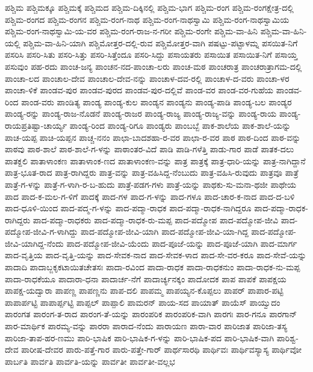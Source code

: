 ಪಶ್ಚಿಮ
ಪಶ್ಚಿಮಕ್ಕೂ
ಪಶ್ಚಿಮಕ್ಕೆ
ಪಶ್ಚಿಮದ
ಪಶ್ಚಿಮ-ದಿಕ್ಕಿನಲ್ಲಿ
ಪಶ್ಚಿಮ-ಭಾಗ
ಪಶ್ಚಿಮ-ರಂಗ
ಪಶ್ಚಿಮ-ರಂಗಕ್ಷೇತ್ರ-ದಲ್ಲಿ
ಪಶ್ಚಿಮ-ರಂಗದ
ಪಶ್ಚಿಮ-ರಂಗನ
ಪಶ್ಚಿಮ-ರಂಗ-ನಾಥ
ಪಶ್ಚಿಮ-ರಂಗ-ನಾಥಸ್ವಾಮಿ
ಪಶ್ಚಿಮ-ರಂಗ-ನಾಥಸ್ವಾಮಿಯ
ಪಶ್ಚಿಮ-ರಂಗ-ನಾಥಸ್ವಾಮಿ-ಯ-ವರ
ಪಶ್ಚಿಮ-ರಂಗ-ರಾಜ-ನ-ಗರೀ
ಪಶ್ಚಿಮ-ರಂಗೇ
ಪಶ್ಚಿಮ-ವಾ-ಹಿನಿ
ಪಶ್ಚಿಮ-ವಾ-ಹಿನಿ-ಯಲ್ಲಿ
ಪಶ್ಚಿಮ-ವಾ-ಹಿನಿ-ಯಾಗಿ
ಪಶ್ಚಿಮೋತ್ತರ-ದಲ್ಲಿ-ರುವ
ಪಶ್ಚಿಮೋತ್ತರ-ವಾಗಿ
ಪಷಟ್ಟು-ಪಟ್ಟಾಳಮ್ನ
ಪಸಯಿತ-ನಿಗೆ
ಪಸರಿಸಿ
ಪಸರಿ-ಸಿತು
ಪಸರಿ-ಸಿತ್ತು
ಪಸರಿ-ಸಿತ್ತೆಂದೂ
ಪಸರಿ-ಸಿದ್ದು
ಪಸಾಯತರು
ಪಸಾಯಿತ
ಪಸಾಯಿತ-ನಿಗೆ
ಪಸಾಯ್ತ
ಪಸುವುಂ
ಪಹ-ರದು
ಪಾಂಚ-ಜನ್ಯ
ಪಾಂಚನ-ನದ-ಪಾಂಚಾ-ಲರು
ಪಾಂಚ-ಮಠ
ಪಾಂಚರಾತ್ರ
ಪಾಂಚರಾತ್ರಾಗಮ-ದಲ್ಲಿ
ಪಾಂಚಾ-ಲದ
ಪಾಂಚಾಲ-ದೇವ
ಪಾಂಚಾಲ-ದೇವ-ನನ್ನು
ಪಾಂಚಾಳ-ದವ-ರಲ್ಲಿ
ಪಾಂಚಾಳ-ದ-ವರು
ಪಾಂಚಾ-ಳರ
ಪಾಂಚಾ-ಳಿಕೆ
ಪಾಂಡವ-ಪುರ
ಪಾಂಡವ-ಪುರದ
ಪಾಂಡವ-ಪುರ-ದಲ್ಲಿವೆ
ಪಾಂಡ-ವರ
ಪಾಂಡ-ವರ-ಗುಹೆಯ
ಪಾಂಡವ-ರಿಂದ
ಪಾಂಡ-ವರು
ಪಾಂಡಿತ್ಯ
ಪಾಂಡ್ಯ
ಪಾಂಡ್ಯ-ಕುಲ
ಪಾಂಡ್ಯನ
ಪಾಂಡ್ಯನು
ಪಾಂಡ್ಯ-ಪಾಡಿ
ಪಾಂಡ್ಯ-ಬಲ
ಪಾಂಡ್ಯರ
ಪಾಂಡ್ಯ-ರನ್ನು
ಪಾಂಡ್ಯ-ರಾಜ-ನೊಡನೆ
ಪಾಂಡ್ಯ-ರಾಜರ
ಪಾಂಡ್ಯ-ರಾಜ್ಯ
ಪಾಂಡ್ಯ-ರಾಜ್ಯ-ವನ್ನು
ಪಾಂಡ್ಯ-ರಾಯ
ಪಾಂಡ್ಯ-ರಾಯಪ್ರತಿಷ್ಟಾ-ಚಾರ್ಯ್ಯ
ಪಾಂಡ್ಯ-ರಿಂದ
ಪಾಂಡ್ಯ-ರಿಗೂ
ಪಾಂಡ್ಯರು
ಪಾಂಬಬ್ಬೆ
ಪಾಕ-ಶಾಲೆಯ
ಪಾಕ-ಶಾಲೆ-ಯನ್ನು
ಪಾಚ-ಯಪ್ಪ
ಪಾಚಿ-ಯಪ್ಪನ
ಪಾಚ್ಚ-ನನಂ
ಪಾಛಾ-ಬಾದಶಹಾ-ರ-ವರ
ಪಾಛಾ-ರ-ವರ
ಪಾಠ
ಪಾಠ-ದಿಂದ
ಪಾಠ-ವನ್ನು
ಪಾಠವು
ಪಾಠ-ಶಾಲೆ
ಪಾಠ-ಶಾಲೆ-ಗ-ಳನ್ನು
ಪಾಠಾಂತರ-ವಿದೆ
ಪಾಡಿ
ಪಾಡಿ-ಗಳೆತ್ತಿ
ಪಾಡು-ಗಾರ
ಪಾಡೆ
ಪಾತಕ-ದಲು
ಪಾತಕ್ದಲಿ
ಪಾತಾಳಾಂಕಣ
ಪಾತಾಳಾಂಕ-ಣದ
ಪಾತಾಳಾಂಕಣ-ವನ್ನು
ಪಾತ್ರ
ಪಾತ್ರಕ್ಕೆ
ಪಾತ್ರ-ಧಾರಿ-ಯನ್ನು
ಪಾತ್ರ-ನಾಗಿದ್ದಾನೆ
ಪಾತ್ರ-ಭೂತ-ರಾದ
ಪಾತ್ರ-ರಾಗಿದ್ದರು
ಪಾತ್ರ-ವನ್ನು
ಪಾತ್ರ-ವಹಿಸಿದ್ದ-ನೆಂಬುದು
ಪಾತ್ರ-ವಹಿಸಿ-ರುವುದು
ಪಾತ್ರವೂ
ಪಾತ್ರೆ
ಪಾತ್ರೆ-ಗ-ಳನ್ನು
ಪಾತ್ರೆ-ಗ-ಳಾಗಿ-ರ-ಬ-ಹುದು
ಪಾತ್ರೆ-ಪಡಗ-ಗಳು
ಪಾತ್ರೆ-ಯನ್ನು
ಪಾಥಕು-ಸು-ಮನಾ-ಥಜೀ
ಪಾಥೇಯ
ಪಾದ
ಪಾದ-ಕ-ಮಲ-ಗ-ಳಿಗೆ
ಪಾದಕ್ಕೆ
ಪಾದ-ಗಳ
ಪಾದ-ಗ-ಳನ್ನು
ಪಾದ-ಗಳೂ
ಪಾದ-ಚಾರ-ಕ-ನಾದ
ಪಾದ-ದ-ಬಳಿ
ಪಾದ-ಧೂಳಿ-ಯಿಂದ
ಪಾದ-ಪದ್ಮ-ಗ-ಳನ್ನು
ಪಾದ-ಪದ್ಮಾ-ರಾಧಕ
ಪಾದ-ಪದ್ಮಾ-ರಾಧಕ-ನಾಗಿದ್ದರೂ
ಪಾದ-ಪದ್ಮಾ-ರಾಧಕ-ರಾಗಿದ್ದರು
ಪಾದ-ಪದ್ಮಾ-ರಾಧಕರು
ಪಾದ-ಪದ್ಮಾ-ರಾಧಕ-ರು-ಮಪ್ಪ
ಪಾದ-ಪದ್ಮೋಪ
ಪಾದ-ಪದ್ಮೋಪ-ಜೀವಿ
ಪಾದ-ಪದ್ಮೋಪ-ಜೀವಿ-ಗ-ಳಾಗಿದ್ದು
ಪಾದ-ಪದ್ಮೋಪ-ಜೀವಿ-ಯಾಗಿ
ಪಾದ-ಪದ್ಮೋಪ-ಜೀವಿ-ಯಾ-ಗಿದ್ದ
ಪಾದ-ಪದ್ಮೋಪ-ಜೀವಿ-ಯಾಗಿದ್ದ-ನೆಂದು
ಪಾದ-ಪದ್ಮೋಪ-ಜೀವಿ-ಯೆಂದು
ಪಾದ-ಪೂಜೆ-ಯನ್ನು
ಪಾದ-ಪೂಜೆ-ಯಾಗಿ
ಪಾದ-ಮಾರ್ಗ
ಪಾದ-ವೃತ್ತಿಯ
ಪಾದ-ವೃತ್ತಿ-ಯನ್ನು
ಪಾದ-ಸೇವಕ-ನಾದ
ಪಾದ-ಸೇವಕ-ಳಾದ
ಪಾದ-ಸೇ-ವರ-ಕರೂ
ಪಾದ-ಸೇವೆ-ಯನ್ನು
ಪಾದಾದಿ
ಪಾದಾಬ್ಜಕೃಕಟಾಯಿತಚೇತಸಃ
ಪಾದಾ-ರವಿಂದ
ಪಾದಾ-ರಾಧಕ
ಪಾದಾ-ರಾಧಕನುಂ
ಪಾದಾ-ರಾಧಕ-ನು-ಮಪ್ಪ
ಪಾದಾ-ರಾಧಕೆಯೂ
ಪಾದಾರಾ-ಧನಾ
ಪಾದಾರ್ಚ-ನೆಗೆ
ಪಾದಾರ್ಚ್ಯನಕ್ಕಂ
ಪಾದೋದಕ
ಪಾಪ
ಪಾಪಕೆ
ಪಾಪಕ್ಷಯ
ಪಾಪಕ್ಷ-ಯದ್ವಾರಾ
ಪಾಪಣ್ಣ
ಪಾಪಣ್ಣನು
ಪಾಪ-ದಲಿ
ಪಾಪಮ್ಮ
ಪಾಪಯ್ಯನ-ಕೊಪ್ಪಲು
ಪಾಪರ್
ಪಾಪಾರ-ಪಟ್ಟಿ
ಪಾಪಾರ್ಪಟ್ಟಿ
ಪಾಪಾರ್ಪ್ಪಟ್ಟಿ
ಪಾಪ್ಪಲ್
ಪಾಪ್ಪಾಲಿ
ಪಾಮರನ್
ಪಾಯ-ಸದ
ಪಾಯಾತ್
ಪಾಯೆಸ್
ಪಾಯ್ವುದಂ
ಪಾರಂಗತ
ಪಾರಂಗ-ತ-ರಾದ
ಪಾರಂಗ-ತೆ-ಯನ್ನು
ಪಾರಂಪರಿಕ
ಪಾರಂಪರಿಕ-ವಾಗಿ
ಪಾರಗಃ
ಪಾರ-ಗನೂ
ಪಾರಗಾನ್
ಪಾರ-ಮಾರ್ಥಿಕ
ಪಾರಮ್ಯ-ವನ್ನು
ಪಾರರಾ
ಪಾರಾದ-ನೆಂದು
ಪಾರಾಯಣ
ಪಾರಾ-ವಾರ
ಪಾರಿಜಾತ
ಪಾರಿಜಾ-ತಸ್ಯ
ಪಾರಿಜಾ-ತಾಪ-ಹರ-ಣಮು
ಪಾರಿ-ಭಾಷಿಕ
ಪಾರಿ-ಭಾಷಿಕ-ಗ-ಳನ್ನು
ಪಾರಿ-ಭಾಷಿಕ-ಪದ
ಪಾರಿ-ಭಾಷಿಕ-ವಾಗಿ
ಪಾರಿಶ್ವ-ದೇವ
ಪಾರೀಷ-ದೇವರ
ಪಾರು-ಪತ್ತೆ-ಗಾರ
ಪಾರು-ಪತ್ತೇ-ಗಾರ್
ಪಾರ್ಥಸಾರಥಿ
ಪಾರ್ಥಿವಃ
ಪಾರ್ಥಿವಸ್ಯಾಸ್ಯ
ಪಾರ್ಥಿವೋ
ಪಾರ್ಬತಿ
ಪಾರ್ವತಿ
ಪಾರ್ವತಿ-ಯನ್ನು
ಪಾರ್ವತೀ
ಪಾರ್ವತೀ-ವಲ್ಲಭ
